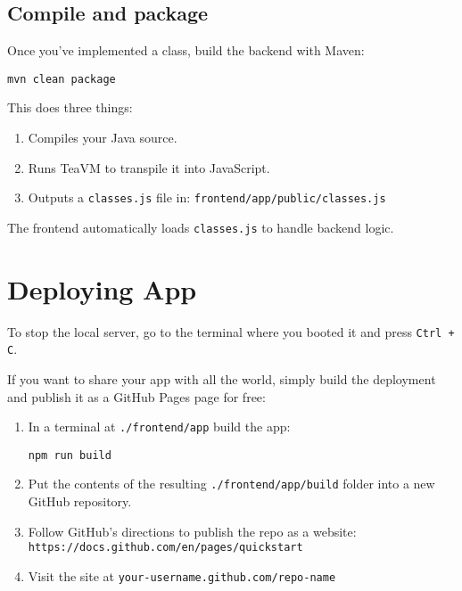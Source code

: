 \documentclass[11pt,letterpaper]{article}
\newcommand{\code}[1]{\texttt{\small #1}}
\begin{document}
\subsection{Compile and package}
Once you've implemented a class, build the backend with Maven:
\begin{lstlisting}
mvn clean package
\end{lstlisting}

This does three things:
\begin{enumerate}[leftmargin=*]
    \item Compiles your Java source.
    \item Runs TeaVM to transpile it into JavaScript.
    \item Outputs a \code{classes.js} file in: \code{frontend/app/public/classes.js}
\end{enumerate}

The frontend automatically loads \code{classes.js} to handle backend logic.

\section{Deploying App}

To stop the local server, go to the terminal where you booted it and press \texttt{Ctrl + C}.

If you want to share your app with all the world, simply build the deployment and publish it as a GitHub Pages page for free:

\begin{enumerate}[leftmargin=*]
    \item In a terminal at \code{./frontend/app} build the app:
    \begin{lstlisting}
npm run build
    \end{lstlisting}
    
    \item Put the contents of the resulting \code{./frontend/app/build} folder into a new GitHub repository.
    
    \item Follow GitHub's directions to publish the repo as a website:\\
    \texttt{https://docs.github.com/en/pages/quickstart}
    
    \item Visit the site at \code{your-username.github.com/repo-name}
\end{enumerate}
\end{document}
